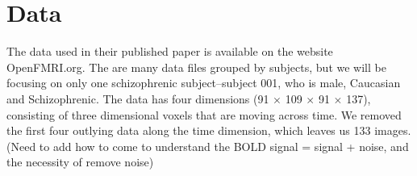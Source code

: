 \section{Data}

The data used in their published paper is available on the website OpenFMRI.org.
The are many data files grouped by subjects, but we will be focusing on only one
schizophrenic subject--subject 001, who is male, Caucasian and Schizophrenic.
The data has four dimensions (91 $\times$ 109 $\times$ 91 $\times$ 137), 
consisting of three dimensional voxels that are moving across time. We removed 
the first four outlying data along the time dimension, which leaves us 133 images. 
(Need to add how to come to understand the BOLD signal = signal + noise, and 
the necessity of remove noise)

